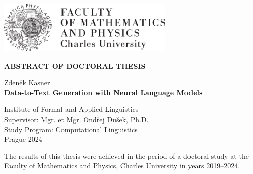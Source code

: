 \documentclass[12pt,notitlepage,a4paper,openright]{report}
\begin{document}
\begin{titlepage}
  \begin{center}
    \ \\

    \vspace{20mm}

    \includegraphics[height=25mm]{logo-mff.pdf}

    \vspace{30mm}

    {\Large\bf \uppercase{Abstract of Doctoral Thesis}}

    \vspace{20mm}

    {\Large\textnormal Zdeněk Kasner}\\

    \vspace{\gapsize}
    {\Large\bf Data-to-Text Generation with Neural Language Models}\\
  \end{center}
  \vspace{1mm}
  \begin{center}
    \large
    Institute of Formal and Applied Linguistics\\
    \vspace{\gapsize}
    \noindent Supervisor: Mgr. et Mgr. Ondřej Dušek, Ph.D.\\
    \vspace{\gapsize}
    {%
      \noindent Study Program: Computational Linguistics\\
    }
    \vspace{\gapsize}
    Prague 2024
  \end{center}
\end{titlepage}


\pagestyle{plain}
\normalsize

\noindent The results of this thesis were achieved in the period of a doctoral study at the Faculty of Mathematics and Physics, Charles University in years 2019–2024.
\end{document}
